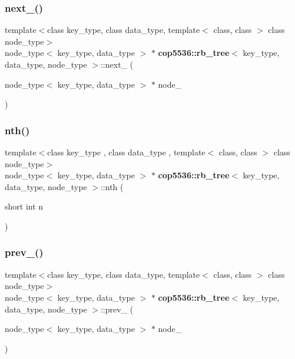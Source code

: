 \subsubsection{next\_()}
{\footnotesize\ttfamily template$<$class key\+\_\+type, class data\+\_\+type, template$<$ class, class $>$ class node\+\_\+type$>$ \\
node\+\_\+type$<$ key\+\_\+type, data\+\_\+type $>$ $\ast$ \textbf{ cop5536\+::rb\+\_\+tree}$<$ key\+\_\+type, data\+\_\+type, node\+\_\+type $>$\+::next\+\_\+ (\begin{DoxyParamCaption}\item[{node\+\_\+type$<$ key\+\_\+type, data\+\_\+type $>$ $\ast$}]{node\+\_\+ }\end{DoxyParamCaption})\hspace{0.3cm}{\ttfamily [inline]}}

\mbox{\label{classcop5536_1_1rb__tree_a0c98d8eeb9ba9cfd53114da6a8f1e2a8}} 
\subsubsection{nth()}
{\footnotesize\ttfamily template$<$class key\+\_\+type , class data\+\_\+type , template$<$ class, class $>$ class node\+\_\+type$>$ \\
node\+\_\+type$<$ key\+\_\+type, data\+\_\+type $>$ $\ast$ \textbf{ cop5536\+::rb\+\_\+tree}$<$ key\+\_\+type, data\+\_\+type, node\+\_\+type $>$\+::nth (\begin{DoxyParamCaption}\item[{short int}]{n }\end{DoxyParamCaption})\hspace{0.3cm}{\ttfamily [inline]}}

\mbox{\label{classcop5536_1_1rb__tree_ad10373a32f6dcb963da22ad36d507fb2}} 
\subsubsection{prev\_()}
{\footnotesize\ttfamily template$<$class key\+\_\+type, class data\+\_\+type, template$<$ class, class $>$ class node\+\_\+type$>$ \\
node\+\_\+type$<$ key\+\_\+type, data\+\_\+type $>$ $\ast$ \textbf{ cop5536\+::rb\+\_\+tree}$<$ key\+\_\+type, data\+\_\+type, node\+\_\+type $>$\+::prev\+\_\+ (\begin{DoxyParamCaption}\item[{node\+\_\+type$<$ key\+\_\+type, data\+\_\+type $>$ $\ast$}]{node\+\_\+ }\end{DoxyParamCaption})\hspace{0.3cm}{\ttfamily [inline]}}

